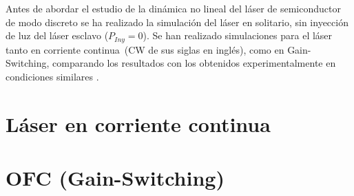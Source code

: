 \graphicspath{{../Graphics/Cpt1-Charactz/}}

\newcommand{\cw}{corriente continua}

Antes de abordar el estudio de la dinámica no lineal del láser de semiconductor de modo discreto se ha realizado la simulación del láser en solitario, sin inyección de luz del láser esclavo ($P_{Iny} = 0$). Se han realizado simulaciones para el láser tanto en \cw\ (CW de sus siglas en inglés), como en Gain-Switching, comparando los resultados con los obtenidos experimentalmente en condiciones similares \cite{Chaves19}.

	\section{Láser en \cw}
		
		

	\section{OFC (Gain-Switching)}

		

